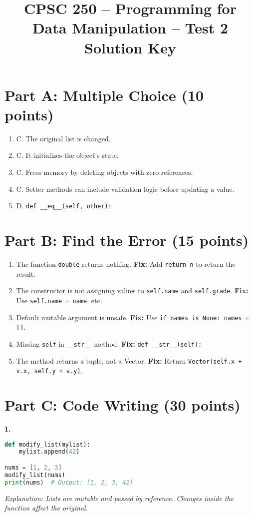 \documentclass[11pt]{article}
\title{CPSC 250 – Programming for Data Manipulation – Test 2\\Solution Key}
\date{}
\begin{document}
\maketitle

\section*{Part A: Multiple Choice (10 points)}
\begin{enumerate}[label=\arabic*.]
    \item C. The original list is changed.
    \item C. It initializes the object’s state.
    \item C. Frees memory by deleting objects with zero references.
    \item C. Setter methods can include validation logic before updating a value.
    \item D. \verb|def __eq__(self, other):|
\end{enumerate}

\section*{Part B: Find the Error (15 points)}

\begin{enumerate}[label=\arabic*.]
    \item The function \verb|double| returns nothing. \textbf{Fix:} Add \verb|return n| to return the result.
    \item The constructor is not assigning values to \verb|self.name| and \verb|self.grade|. \textbf{Fix:} Use \verb|self.name = name|, etc.
    \item Default mutable argument is unsafe. \textbf{Fix:} Use \verb|if names is None: names = []|.
    \item Missing \verb|self| in \verb|__str__| method. \textbf{Fix:} \verb|def __str__(self):|
    \item The method returns a tuple, not a Vector. \textbf{Fix:} Return \verb|Vector(self.x + v.x, self.y + v.y)|.
\end{enumerate}

\section*{Part C: Code Writing (30 points)}

\textbf{1.}
\begin{lstlisting}[language=Python]
def modify_list(mylist):
    mylist.append(42)

nums = [1, 2, 3]
modify_list(nums)
print(nums)  # Output: [1, 2, 3, 42]
\end{lstlisting}
\textit{Explanation: Lists are mutable and passed by reference. Changes inside the function affect the original.}
\end{document}
